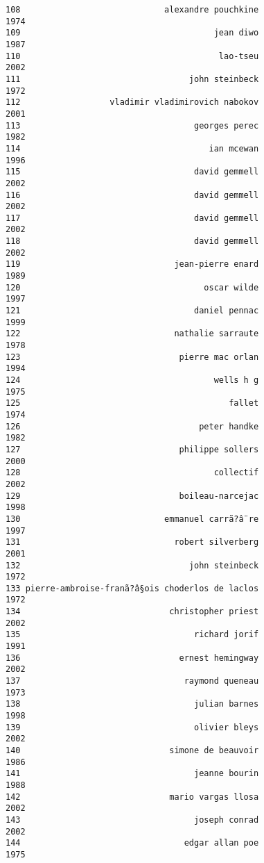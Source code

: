 \documentclass[
]{report}
\begin{document}
\begin{verbatim}
108                             alexandre pouchkine                1974
109                                       jean diwo                1987
110                                        lao-tseu                2002
111                                  john steinbeck                1972
112                  vladimir vladimirovich nabokov                2001
113                                   georges perec                1982
114                                      ian mcewan                1996
115                                   david gemmell                2002
116                                   david gemmell                2002
117                                   david gemmell                2002
118                                   david gemmell                2002
119                               jean-pierre enard                1989
120                                     oscar wilde                1997
121                                   daniel pennac                1999
122                               nathalie sarraute                1978
123                                pierre mac orlan                1994
124                                       wells h g                1975
125                                          fallet                1974
126                                    peter handke                1982
127                                philippe sollers                2000
128                                       collectif                2002
129                                boileau-narcejac                1998
130                             emmanuel carrã?â¨re                1997
131                               robert silverberg                2001
132                                  john steinbeck                1972
133 pierre-ambroise-franã?â§ois choderlos de laclos                1972
134                              christopher priest                2002
135                                   richard jorif                1991
136                                ernest hemingway                2002
137                                 raymond queneau                1973
138                                   julian barnes                1998
139                                   olivier bleys                2002
140                              simone de beauvoir                1986
141                                   jeanne bourin                1988
142                              mario vargas llosa                2002
143                                   joseph conrad                2002
144                                 edgar allan poe                1975

\end{verbatim}
\end{document}
